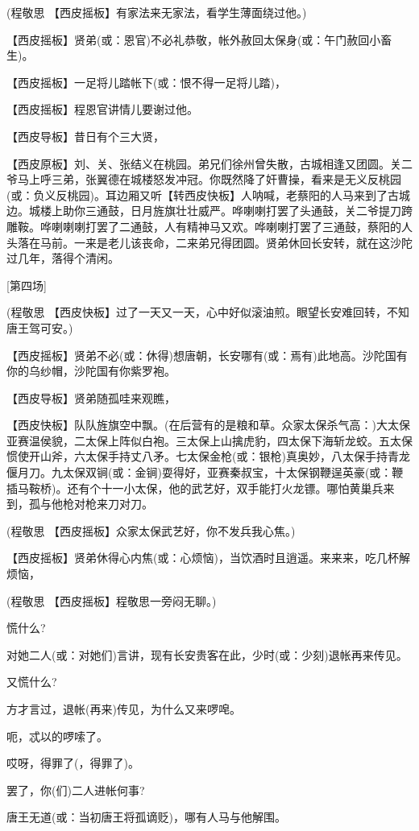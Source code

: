 (程敬思 【西皮摇板】有家法来无家法，看学生薄面绕过他。)

【西皮摇板】贤弟(或：恩官)不必礼恭敬，帐外赦回太保身(或：午门赦回小畜生)。

【西皮摇板】一足将儿踏帐下(或：恨不得一足将儿踏)，

【西皮摇板】程恩官讲情儿要谢过他。

【西皮导板】昔日有个三大贤，

【西皮原板】刘、关、张结义在桃园。弟兄们徐州曾失散，古城相逢又团圆。关二爷马上呼三弟，张翼德在城楼怒发冲冠。你既然降了奸曹操，看来是无义反桃园(或：负义反桃园)。耳边厢又听【转西皮快板】人呐喊，老蔡阳的人马来到了古城边。城楼上助你三通鼓，日月旌旗壮壮威严。哗喇喇打罢了头通鼓，关二爷提刀跨雕鞍。哗喇喇喇打罢了二通鼓，人有精神马又欢。哗喇喇打罢了三通鼓，蔡阳的人头落在马前。一来是老儿该丧命，二来弟兄得团圆。贤弟休回长安转，就在这沙陀过几年，落得个清闲。

{[}第四场{]}

(程敬思
【西皮快板】过了一天又一天，心中好似滚油煎。眼望长安难回转，不知唐王驾可安。)

【西皮摇板】贤弟不必(或：休得)想唐朝，长安哪有(或：焉有)此地高。沙陀国有你的乌纱帽，沙陀国有你紫罗袍。

【西皮导板】贤弟随孤哇来观瞧，

【西皮快板】队队旌旗空中飘。(在后营有的是粮和草。众家太保杀气高：)大太保亚赛温侯貌，二太保上阵似白袍。三太保上山擒虎豹，四太保下海斩龙蛟。五太保惯使开山斧，六太保手持丈八矛。七太保金枪(或：银枪)真奥妙，八太保手持青龙偃月刀。九太保双锏(或：金锏)耍得好，亚赛秦叔宝，十太保钢鞭逞英豪(或：鞭插马鞍桥)。还有个十一小太保，他的武艺好，双手能打火龙镖。哪怕黄巢兵来到，孤与他枪对枪来刀对刀。

(程敬思 【西皮摇板】众家太保武艺好，你不发兵我心焦。)

【西皮摇板】贤弟休得心内焦(或：心烦恼)，当饮酒时且逍遥。来来来，吃几杯解烦恼，

(程敬思 【西皮摇板】程敬思一旁闷无聊。)

慌什么?

对她二人(或：对她们)言讲，现有长安贵客在此，少时(或：少刻)退帐再来传见。

又慌什么?

方才言过，退帐(再来)传见，为什么又来啰唣。

呃，忒以的啰嗦了。

哎呀，得罪了(，得罪了)。

罢了，你(们)二人进帐何事?

唐王无道(或：当初唐王将孤谪贬)，哪有人马与他解围。

